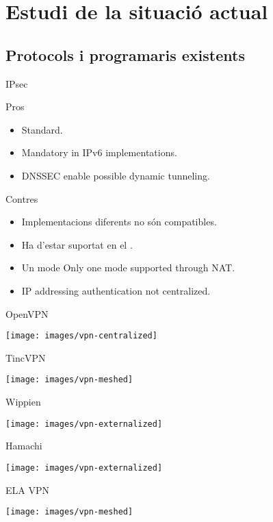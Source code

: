 \section{Estudi de la situació actual}
\subsection{Protocols i programaris existents}
    \begin{frame}{IPsec}
	\begin{exampleblock}{Pros}
		\begin{itemize}
\item Standard.
\item Mandatory in IPv6 implementations.
\item DNSSEC enable possible dynamic tunneling.
		\end{itemize}
	\end{exampleblock}
	\begin{alertblock}{Contres}
		\begin{itemize}
\item Implementacions diferents \alert{no són compatibles}.
\item Ha d'estar suportat en el .
\item Un mode Only one mode supported through NAT.
\item IP addressing authentication not centralized.
		\end{itemize}
	\end{alertblock}
    \end{frame}
    \begin{frame}{OpenVPN}
        \begin{center}
        \texttt{[image: images/vpn-centralized]}
        \end{center}
    \end{frame}
    \begin{frame}{TincVPN}
        \begin{center}
        \texttt{[image: images/vpn-meshed]}
        \end{center}
    \end{frame}
    \begin{frame}{Wippien}
        \begin{center}
        \texttt{[image: images/vpn-externalized]}
        \end{center}
    \end{frame}
    \begin{frame}{Hamachi}
        \begin{center}
        \texttt{[image: images/vpn-externalized]}
        \end{center}
    \end{frame}
    \begin{frame}{ELA VPN}
        \begin{center}
        \texttt{[image: images/vpn-meshed]}
        \end{center}
    \end{frame}

